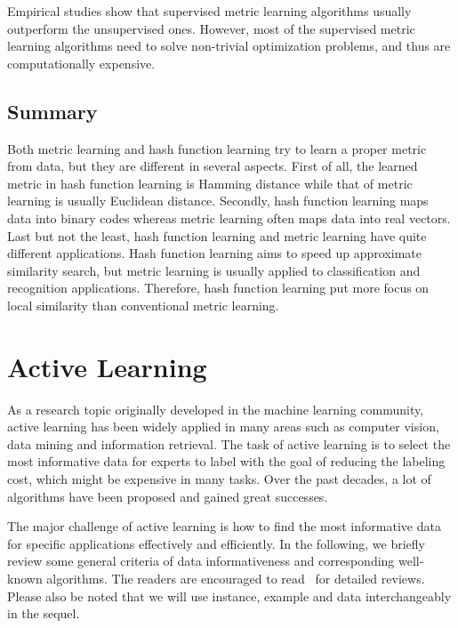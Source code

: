 Empirical studies show that supervised metric learning algorithms usually outperform the unsupervised ones. However, most of the supervised metric learning algorithms need to solve non-trivial optimization problems, and thus are computationally expensive.



\subsection{Summary}
Both metric learning and hash function learning try to learn a proper metric from data, but they are different in several aspects. First of all, the learned metric in hash function learning is Hamming distance while that of metric learning is usually Euclidean distance. Secondly, hash function learning maps data into binary codes whereas metric learning often maps data into real vectors. Last but not the least, hash function learning and metric learning have quite different applications. Hash function learning aims to speed up approximate similarity search, but metric learning is usually applied to classification and recognition applications. Therefore, hash function learning put more focus on local similarity than conventional metric learning.


\section{Active Learning}
As a research topic originally developed in the machine learning community, active learning has been widely applied in many areas such as computer vision, data mining and information retrieval. The task of active learning is to select the most informative data for experts to label with the goal of reducing the labeling cost, which might be expensive in many tasks. Over the past decades, a lot of algorithms have been proposed and gained great successes. 

The major challenge of active learning is how to find the most informative data for specific applications effectively and efficiently. In the following, we briefly review some general criteria of data informativeness and corresponding well-known algorithms. The readers are encouraged to read~\cite{Settles2009survey,tong2001thesis} for detailed reviews. Please also be noted that we will use instance, example and data interchangeably in the sequel.

